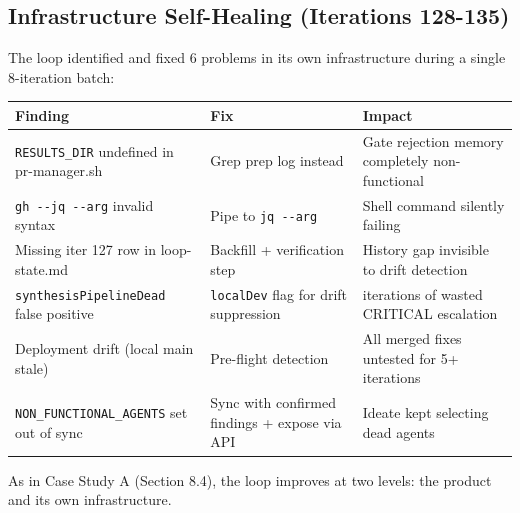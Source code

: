 \documentclass[11pt,a4paper]{article}
\newcounter{none} %
\begin{document}
\subsection{Infrastructure Self-Healing (Iterations 128-135)}\label{sec:infrastructure-self-healing-iterations-128-135}

The loop identified and fixed 6 problems in its own infrastructure during a single 8-iteration batch:

{\def\LTcaptype{none} %
\begin{longtable}[]{@{}
  >{\raggedright\arraybackslash}p{}
  >{\raggedright\arraybackslash}p{}
  >{\raggedright\arraybackslash}p{}@{}}
\toprule\noalign{}
\begin{minipage}[b]{\linewidth}\raggedright
Finding
\end{minipage} & \begin{minipage}[b]{\linewidth}\raggedright
Fix
\end{minipage} & \begin{minipage}[b]{\linewidth}\raggedright
Impact
\end{minipage} \\
\midrule\noalign{}
\endhead
\bottomrule\noalign{}
\endlastfoot
\texttt{RESULTS\_DIR} undefined in pr-manager.sh & Grep prep log instead & Gate rejection memory completely non-functional \\
\texttt{gh\ -\/-jq\ -\/-arg} invalid syntax & Pipe to \texttt{jq\ -\/-arg} & Shell command silently failing \\
Missing iter 127 row in loop-state.md & Backfill + verification step & History gap invisible to drift detection \\
\texttt{synthesisPipelineDead} false positive & \texttt{localDev} flag for drift suppression & 9 iterations of wasted CRITICAL escalation \\
Deployment drift (local main stale) & Pre-flight detection & All merged fixes untested for 5+ iterations \\
\texttt{NON\_FUNCTIONAL\_AGENTS} set out of sync & Sync with confirmed findings + expose via API & Ideate kept selecting dead agents \\
\end{longtable}
}

As in Case Study A (Section 8.4), the loop improves at two levels: the product and its own infrastructure.
\end{document}
